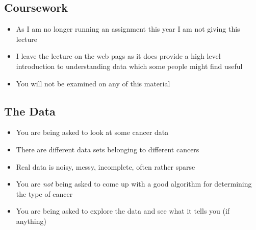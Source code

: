 
\begin{slide}
\section[-1]{Coursework}

\begin{PauseHighLight}
  \begin{itemize}
  \item As I am no longer running an assignment this year I am not
    giving this lecture\pause
  \item I leave the lecture on the web pags as it does provide a high
    level introduction to understanding data which some people might
    find useful\pause
  \item You will not be examined on any of this material\pause
  \end{itemize}
\end{PauseHighLight}


\end{slide}


\begin{slide}
\section{The Data}

\begin{PauseHighLight}
  \begin{itemize}
  \item You are being asked to look at some cancer data\pause
  \item There are different data sets belonging to different
    cancers\pause
  \item Real data is noisy, messy, incomplete, often rather sparse\pause
  \item You are \emph{not} being asked to come up with a good algorithm
    for determining the type of cancer\pause
  \item You are being asked to explore the data and see what it tells
    you (if anything)\pause
  \end{itemize}
\end{PauseHighLight}

\end{slide}


